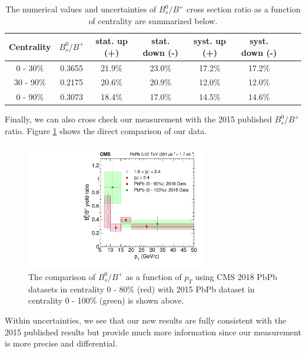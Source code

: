 \begin{table}[h]
\begin{center}
\caption{The numerical values and uncertainties of $B^0_s/B^+$ cross section ratio as a function of centrality are summarized below.}
\vspace{1em}
\label{BsBPPtCMS}
  \begin{tabular}{| c | c |c | c| c| c| c| c|}
    \hline
Centrality & $B^0_s/B^+$ & stat. up (+) & stat. down (-)  & syst. up (+) & syst. down (-)  \\
    \hline
    \hline
    0 - 30\%  & 0.3655  & 21.9\%  & 23.0\% &  17.2\% & 17.2\% \\
    30 - 90\%  &  0.2175 & 20.6\% & 20.9\% &  12.0\%  & 12.0\%   \\
      0 - 90\%  & 0.3073   & 18.4\%  & 17.0\% &  14.5\% & 14.6\% \\
    \hline
    \hline
\end{tabular}
\end{center}
\end{table}


Finally, we can also cross check our measurement with the 2015 published $B^0_s/B^+$ ratio. Figure \ref{2018Comp2015} shows the direct comparison of our data.

\begin{figure}[hbtp]
\begin{center}
\includegraphics[width=0.70\textwidth]{Figures/Chapter5/2018Comp2015.pdf}
\caption{The comparison of $B^0_s/B^+$ as a function of $p_T$ using CMS 2018 PbPb datasets in centrality 0 - 80\% (red) with 2015 PbPb dataset in centrality 0 - 100\% (green) is shown above.}
\label{2018Comp2015}
\end{center}
\end{figure}

Within uncertainties, we see that our new results are fully consistent with the 2015 published results but provide much more information since our measurement is more precise and differential.  

